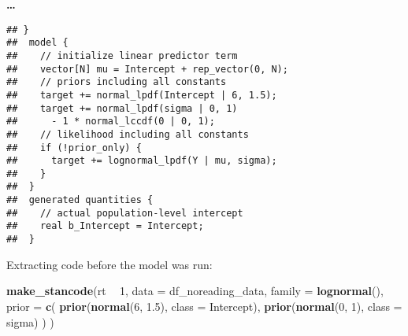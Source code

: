 \documentclass[12pt,ignorenonframetext,aspectratio=169]{beamer}
\newenvironment{Shaded}{\begin{snugshade}}{\end{snugshade}}
\newcommand{\DataTypeTok}[1]{\textcolor[rgb]{0.13,0.29,0.53}{#1}}
\newcommand{\DecValTok}[1]{\textcolor[rgb]{0.00,0.00,0.81}{#1}}
\newcommand{\FloatTok}[1]{\textcolor[rgb]{0.00,0.00,0.81}{#1}}
\newcommand{\KeywordTok}[1]{\textcolor[rgb]{0.13,0.29,0.53}{\textbf{#1}}}
\newcommand{\NormalTok}[1]{#1}
\newcommand{\OperatorTok}[1]{\textcolor[rgb]{0.81,0.36,0.00}{\textbf{#1}}}
\newcommand{\StringTok}[1]{\textcolor[rgb]{0.31,0.60,0.02}{#1}}
\begin{document}
\begin{frame}[fragile]

\textbf{\ldots{}}

\scriptsize

\begin{verbatim}
## } 
##  model { 
##    // initialize linear predictor term 
##    vector[N] mu = Intercept + rep_vector(0, N); 
##    // priors including all constants 
##    target += normal_lpdf(Intercept | 6, 1.5); 
##    target += normal_lpdf(sigma | 0, 1) 
##      - 1 * normal_lccdf(0 | 0, 1); 
##    // likelihood including all constants 
##    if (!prior_only) { 
##      target += lognormal_lpdf(Y | mu, sigma); 
##    } 
##  } 
##  generated quantities { 
##    // actual population-level intercept 
##    real b_Intercept = Intercept; 
##  }
\end{verbatim}

\normalsize

\end{frame}

\begin{frame}[fragile]

\begin{block}{Extracting code before the model was run:}

\vspace{1cm}

\scriptsize

\begin{Shaded}
\begin{Highlighting}[]
\KeywordTok{make_stancode}\NormalTok{(rt }\OperatorTok{~}\StringTok{ }\DecValTok{1}\NormalTok{,}
  \DataTypeTok{data =}\NormalTok{ df_noreading_data,}
  \DataTypeTok{family =} \KeywordTok{lognormal}\NormalTok{(),}
  \DataTypeTok{prior =} \KeywordTok{c}\NormalTok{(}
    \KeywordTok{prior}\NormalTok{(}\KeywordTok{normal}\NormalTok{(}\DecValTok{6}\NormalTok{, }\FloatTok{1.5}\NormalTok{), }\DataTypeTok{class =}\NormalTok{ Intercept),}
    \KeywordTok{prior}\NormalTok{(}\KeywordTok{normal}\NormalTok{(}\DecValTok{0}\NormalTok{, }\DecValTok{1}\NormalTok{), }\DataTypeTok{class =}\NormalTok{ sigma)}
\NormalTok{  )}
\NormalTok{)}
\end{Highlighting}
\end{Shaded}

\normalsize

\end{block}

\end{frame}
\end{document}
